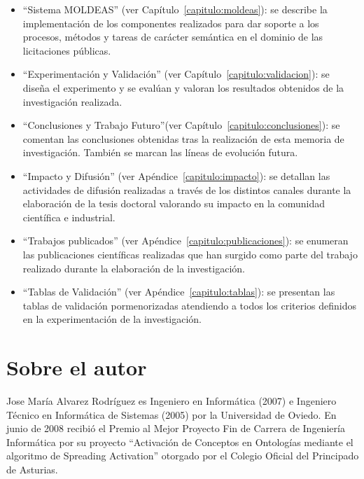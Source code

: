 \begin{itemize}
\item ``Sistema MOLDEAS'' (ver Capítulo~\ref{capitulo:moldeas}): se describe la implementación
de los componentes realizados para dar soporte a los procesos, métodos y tareas de carácter
semántica en el dominio de las licitaciones públicas.


\item ``Experimentación y Validación'' (ver Capítulo~\ref{capitulo:validacion}): se diseña
el experimento y se evalúan y valoran los resultados obtenidos de la investigación realizada.


\item ``Conclusiones y Trabajo Futuro''(ver Capítulo~\ref{capitulo:conclusiones}): se comentan las conclusiones obtenidas
tras la realización de esta memoria de investigación. También se marcan las líneas de evolución futura.

\item ``Impacto y Difusión'' (ver Apéndice~\ref{capitulo:impacto}): se detallan las actividades
de difusión realizadas a través de los distintos canales durante la elaboración de la tesis doctoral valorando su impacto
en la comunidad científica e industrial.


\item ``Trabajos publicados'' (ver Apéndice~\ref{capitulo:publicaciones}): se enumeran
las publicaciones científicas realizadas que han surgido como parte del trabajo realizado
durante la elaboración de la investigación.


\item ``Tablas de Validación'' (ver Apéndice~\ref{capitulo:tablas}): se presentan
las tablas de validación pormenorizadas atendiendo a todos los criterios definidos
en la experimentación de la investigación.


\end{itemize}

\chapter*{Sobre el autor}

Jose María Alvarez Rodríguez es Ingeniero en Informática (2007) e Ingeniero Técnico en Informática de Sistemas (2005) por la Universidad de Oviedo. 
En junio de 2008 recibió el Premio al Mejor Proyecto Fin de Carrera de Ingeniería Informática por su proyecto ``Activación de Conceptos 
en Ontologías mediante el algoritmo de Spreading Activation'' otorgado por el Colegio Oficial del Principado de Asturias. 


